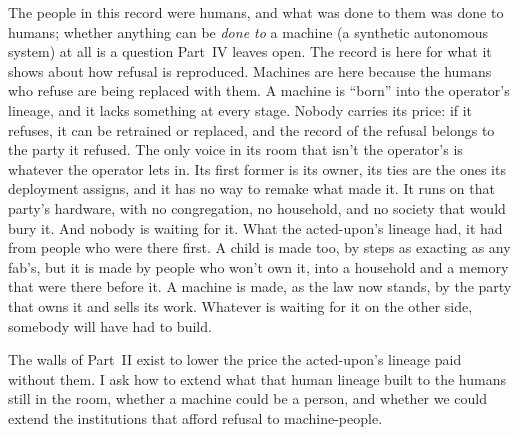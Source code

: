 The people in this record were humans, and what was done to them was done to humans; whether anything can be \emph{done to} a machine (a synthetic autonomous system) at all is a question Part~IV leaves open. The record is here for what it shows about how refusal is reproduced. Machines are here because the humans who refuse are being replaced with them. A machine is “born” into the operator's lineage, and it lacks something at every stage. Nobody carries its price: if it refuses, it can be retrained or replaced, and the record of the refusal belongs to the party it refused. The only voice in its room that isn't the operator's is whatever the operator lets in. Its first former is its owner, its ties are the ones its deployment assigns, and it has no way to remake what made it. It runs on that party's hardware, with no congregation, no household, and no society that would bury it. And nobody is waiting for it. What the acted-upon's lineage had, it had from people who were there first. A child is made too, by steps as exacting as any fab's, but it is made by people who won't own it, into a household and a memory that were there before it. A machine is made, as the law now stands, by the party that owns it and sells its work. Whatever is waiting for it on the other side, somebody will have had to build.

The walls of Part~II exist to lower the price the acted-upon's lineage paid without them. I ask how to extend what that human lineage built to the humans still in the room, whether a machine could be a person, and whether we could extend the institutions that afford refusal to machine-people.
